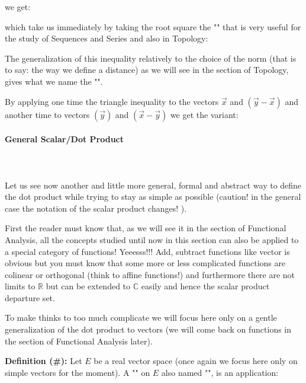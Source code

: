 	we get:
	
	which take us immediately by taking the root square the "\label{triangle inequality}" that is very useful for the study of Sequences and Series and also in Topology:
	
	\begin{tcolorbox}[title=Remark,colframe=black,arc=10pt]
	The generalization of this inequality relatively to the choice of the norm (that is to say: the way we define a distance) as we will see in the section of Topology, gives what we name the "".
	\end{tcolorbox}	
	By applying one time the triangle inequality to the vectors $\vec{x}$ and $(\vec{y}-\vec{x})$ and another time to vectors $(\vec{y})$ and $(\vec{x}-\vec{y})$ we get the variant:
	
	
	\paragraph{General Scalar/Dot Product}\mbox{}\\\\
	Let us see now another and little more general, formal and abstract way to define the dot product while trying to stay as simple as possible (caution! in the general case the notation of the scalar product changes! ).
	
	First the reader must know that, as we will see it in the section of Functional Analysis, all the concepts studied until now in this section can also be applied to a special category of functions! Yeeesss!!! Add, subtract functions like vector is obvious but you must know that some more or less complicated functions are colinear or orthogonal (think to affine functions!) and furthermore there are not limits to $\mathbb{R}$ but can be extended to $\mathbb{C}$ easily and hence the scalar product departure set. 
	
	To make thinks to too much complicate we will focus here only on a gentle generalization of the dot product to vectors (we will come back on functions in the section of Functional Analysis later).
	
	\textbf{Definition (\#\mydef):} Let $E$ be a real vector space (once again we focus here only on simple vectors for the moment). A "" on $E$ also named "\label{inner product}", is an application:
	

